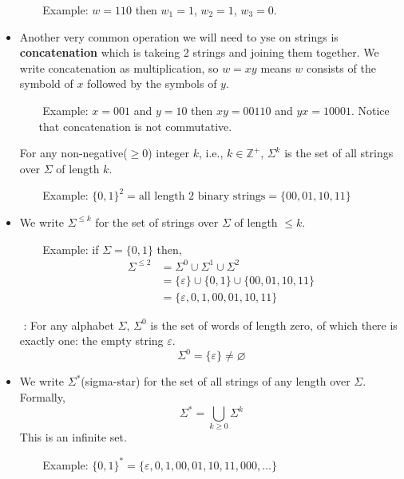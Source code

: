 \documentclass{article}
\begin{document}
\begin{itemize}
\begin{itemize}
        \item [$ $] Example: $w=110$ then $w_1=1$, $w_2=1$, $w_3=0$.
    \end{itemize}
    \item Another very common operation we will need to yse on strings is \textbf{concatenation} which is takeing 2 strings and joining them together. We write concatenation as multiplication, so $w=xy$ means $w$ consists of the symbold of $x$ followed by the symbols of $y$.
    \begin{itemize}
        \item [$ $] Example: $x=001$ and $y=10$ then $xy=00110$ and $yx=10001$. Notice that concatenation is not commutative.
    \end{itemize}
    \begin{tcolorbox} [title= Definition:, colback=black!10!white]
        For any non-negative($\ge 0$) integer $k$, i.e., $k\in\mathbb{Z}^+$, $\Sigma^k$ is the set of all strings over $\Sigma$ of length $k$.
    \end{tcolorbox}
    \begin{itemize}
        \item[$ $] Example: $\{0,1\}^2=\text{all length 2 binary strings} = \{00,01,10,11\}$
    \end{itemize} 
    \item We write $\Sigma^{\le k}$ for the set of strings over $\Sigma$ of length $\le k$. 
    \begin{itemize}
        \item [$ $] Example: if $\Sigma=\{0,1\}$ then,
        \begin{align*}
            \Sigma^{\le 2} &= \Sigma^0 \cup \Sigma^1 \cup \Sigma^2 \\
                           &= \{\varepsilon\} \cup \{0,1\} \cup \{00,01,10,11\} \\
                           &= \{\varepsilon, 0, 1, 00, 01, 10, 11\}
        \end{align*}
        

    \end{itemize}
    \item[$ $] : For any alphabet $\Sigma$, $\Sigma^0$ is the set of words of length zero, of which there is exactly one: the empty string $\varepsilon$.
    $$\Sigma^0 = \{\varepsilon\}\neq\varnothing$$
    \item We write $\Sigma^*$(sigma-star) for the set of all strings of any length over $\Sigma$. Formally, $$\Sigma^*=\bigcup_{k\ge0}\Sigma^k$$
    This is an infinite set.
    \begin{itemize}
        \item [$ $] Example: $\{0,1\}^*=\{\varepsilon, 0, 1, 00, 01, 10, 11, 000,...\}$
    \end{itemize}
\end{itemize}
\end{document}
